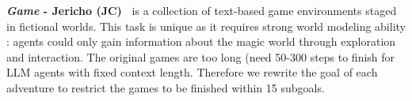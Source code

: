 \textbf{\textit{Game} - Jericho (JC)~\citep{hausknecht2020interactive}}
is a collection of text-based game environments staged in fictional worlds. This task is unique as it requires strong world modeling ability : agents could only gain information about the magic world through exploration and interaction. 
The original games are too long (need 50-300 steps to finish for LLM agents with fixed context length. Therefore we rewrite the goal of each adventure to restrict the games to be finished within 15 subgoals. 

